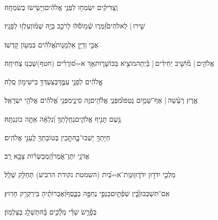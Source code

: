 \documentclass[12pt]{article}
\newcommand{\loc}[1]{\textsuperscript{\locf{#1}}}
\begin{document}
{\loc{ ד}~}‏וְֽצַדִּיקִ֗ים יִשְׂמְח֣וּ  לִפְנֵ֥י אֱלֹהִ֗ים{\hfill}וְיָשִׂ֥ישׂוּ בְשִׂמְחָֽה׃\par

{\loc{ ה}~}‏שִׁ֤ירוּ |  לֵאלֹהִים֮{\hfill}זַמְּר֢וּ שְׁ֫מ֥וֹ\newline\hspace*{.5em}סֹ֡לּוּ לָרֹכֵ֣ב  בְּיָ֥הּ שְׁמ֗וֹ{\hfill}וְעִלְז֥וּ לְפָנָֽיו׃\par

{\loc{ ו}~}‏אֲבִ֣י  וְדַיַּ֣ן אַלְמָנ֑וֹת{\hfill}אֱ֝לֹהִ֗ים בִּמְע֥וֹן קׇדְשֽׁוֹ׃\par

{\loc{ ז}~}‏אֱלֹהִ֤ים |  מ֘וֹשִׁ֤יב יְחִידִ֨ים |  בַּ֗יְתָה{\hfill}מוֹצִ֣יא  בַּכּוֹשָׁר֑וֹת\newline\hspace*{.5em}אַ֥ךְ א=ס֝וֹרֲרִ֗ים (חטף){\hfill}שָׁכְנ֥וּ צְחִיחָֽה׃\par

{\loc{ ח}~}‏אֱֽלֹהִ֗ים  לִפְנֵ֣י עַמֶּ֑ךָ{\hfill}בְּצַעְדְּךָ֖ בִישִׁימ֣וֹן סֶֽלָה׃\par

{\loc{ ט}~}‏אֶ֤רֶץ רָעָ֨שָׁה |  אַף־שָׁמַ֣יִם נָטְפוּ֮{\hfill}מִפְּנֵ֢י אֱלֹ֫הִ֥ים\newline\hspace*{.5em}זֶ֥ה סִינַ֑י{\hfill}מִפְּנֵ֥י אֱ֝לֹהִ֗ים אֱלֹהֵ֥י יִשְׂרָאֵֽל׃\par

{\loc{ י}~}‏גֶּ֣שֶׁם  תָּנִ֣יף אֱלֹהִ֑ים{\hfill}נַחֲלָתְךָ֥ וְ֝נִלְאָ֗ה אַתָּ֥ה כוֹנַנְתָּֽהּ׃\par

{\loc{ יא}~}‏חַיָּתְךָ֥ יָשְׁבוּ־בָ֑הּ{\hfill}תָּ֤כִֽין בְּטוֹבָתְךָ֖ לֶֽעָנִ֣י אֱלֹהִֽים׃\par

{\loc{ יב}~}‏אֲדֹנָ֥י יִתֶּן־אֹ֑מֶר{\hfill}הַֽ֝מְבַשְּׂר֗וֹת צָבָ֥א רָֽב׃\par

{\loc{ יג}~}‏מַלְכֵ֣י  יִדֹּד֣וּן יִדֹּד֑וּן{\hfill}וּנְוַת־א=בַּ֝יִת (השמטת נקודת הרביע) תְּחַלֵּ֥ק שָׁלָֽל׃\par

{\loc{ יד}~}‏אִֽם־תִּשְׁכְּבוּן֮{\hfill}בֵּ֤ין שְׁפַ֫תָּ֥יִם\newline\hspace*{.5em}כַּנְפֵ֣י  נֶחְפָּ֣ה בַכֶּ֑סֶף{\hfill}וְ֝אֶבְרוֹתֶ֗יהָ בִּירַקְרַ֥ק חָרֽוּץ׃\par

{\loc{ טו}~}‏בְּפָ֘רֵ֤שׂ שַׁדַּ֓י מְלָ֘כִ֤ים בָּ֗הּ{\hfill}תַּשְׁלֵ֥ג בְּצַלְמֽוֹן׃\par
\end{document}

